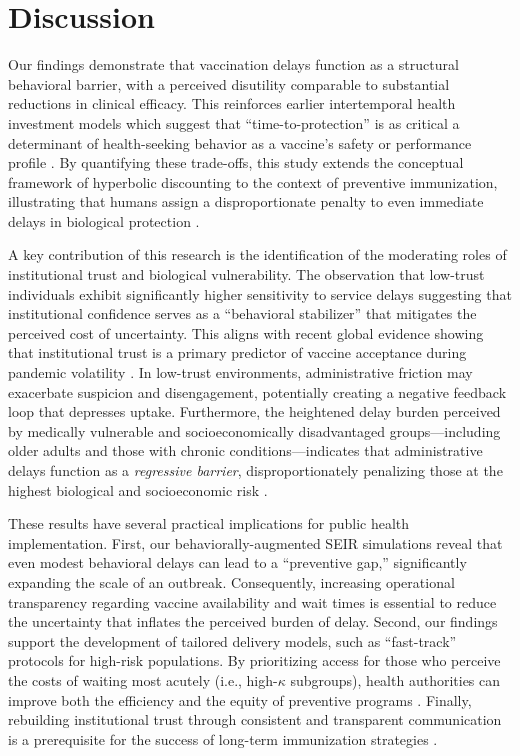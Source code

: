 \section{Discussion}
\label{sec:discussion}

Our findings demonstrate that vaccination delays function as a structural behavioral barrier, with a perceived disutility comparable to substantial reductions in clinical efficacy. This reinforces earlier intertemporal health investment models which suggest that ``time-to-protection'' is as critical a determinant of health-seeking behavior as a vaccine's safety or performance profile \citep{Grossman1972, Determann2014_PLoS}. By quantifying these trade-offs, this study extends the conceptual framework of hyperbolic discounting to the context of preventive immunization, illustrating that humans assign a disproportionate penalty to even immediate delays in biological protection \citep{Laibson1997, O-Donoghue1999}.

A key contribution of this research is the identification of the moderating roles of institutional trust and biological vulnerability. The observation that low-trust individuals exhibit significantly higher sensitivity to service delays suggesting that institutional confidence serves as a ``behavioral stabilizer'' that mitigates the perceived cost of uncertainty. This aligns with recent global evidence showing that institutional trust is a primary predictor of vaccine acceptance during pandemic volatility \citep{Larson2014, Lazarus2021}. In low-trust environments, administrative friction may exacerbate suspicion and disengagement, potentially creating a negative feedback loop that depresses uptake. Furthermore, the heightened delay burden perceived by medically vulnerable and socioeconomically disadvantaged groups---including older adults and those with chronic conditions---indicates that administrative delays function as a \textit{regressive barrier}, disproportionately penalizing those at the highest biological and socioeconomic risk \citep{Shankar2024, Milkman2021}.

These results have several practical implications for public health implementation. First, our behaviorally-augmented SEIR simulations reveal that even modest behavioral delays can lead to a ``preventive gap,'' significantly expanding the scale of an outbreak. Consequently, increasing operational transparency regarding vaccine availability and wait times is essential to reduce the uncertainty that inflates the perceived burden of delay. Second, our findings support the development of tailored delivery models, such as ``fast-track'' protocols for high-risk populations. By prioritizing access for those who perceive the costs of waiting most acutely (i.e., high-$\kappa$ subgroups), health authorities can improve both the efficiency and the equity of preventive programs \citep{Lancsar2008}. Finally, rebuilding institutional trust through consistent and transparent communication is a prerequisite for the success of long-term immunization strategies \citep{Determann2013_EuroSurveill}.

